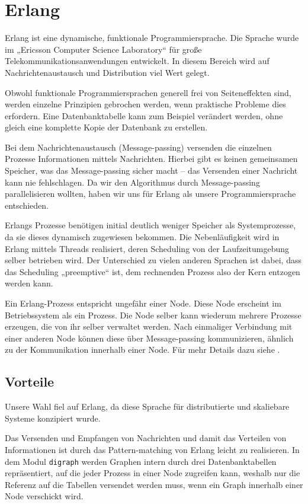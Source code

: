 \chapter{Erlang}
Erlang ist eine dynamische, funktionale Programmiersprache.  Die
Sprache wurde im „Ericsson Computer Science Laboratory“ für große
Telekommunikationsanwendungen entwickelt. In diesem Bereich wird auf
Nachrichtenaustausch und Distribution viel Wert gelegt.

Obwohl funktionale Programmiersprachen generell frei von
Seiteneffekten sind, werden einzelne Prinzipien gebrochen werden, wenn
praktische Probleme dies erfordern.  Eine Datenbanktabelle kann zum
Beispiel verändert werden, ohne gleich eine komplette Kopie der
Datenbank zu erstellen.

Bei dem Nachrichtenaustausch (Message-passing) versenden die einzelnen
Prozesse Informationen mittels Nachrichten.  Hierbei gibt es keinen
gemeinsamen Speicher, was das Message-passing sicher macht – das
Versenden einer Nachricht kann nie fehlschlagen.  Da wir den
Algorithmus durch Message-passing parallelisieren wollten, haben wir
uns für Erlang als unsere Programmiersprache entschieden.

Erlangs Prozesse benötigen initial deutlich weniger Speicher als
Systemprozesse, da sie dieses dynamisch zugewiesen bekommen.  Die
Nebenläufigkeit wird in Erlang mittels Threads realisiert, deren
Scheduling von der Laufzeitumgebung selber betrieben wird.  Der
Unterschied zu vielen anderen Sprachen ist dabei, dass das Scheduling
„preemptive“ ist, dem rechnenden Prozess also der Kern entzogen werden
kann.

Ein Erlang-Prozess entspricht ungefähr einer Node.  Diese Node
erscheint im Betriebssystem als ein Prozess.  Die Node selber kann
wiederum mehrere Prozesse erzeugen, die von ihr selber verwaltet
werden.  Nach einmaliger Verbindung mit einer anderen Node können
diese über Message-passing kommunizieren, ähnlich zu der Kommunikation
innerhalb einer Node.  Für mehr Details dazu siehe
\cite[Kapitel~„Distribunomicon“]{lyse}.

\section{Vorteile}
Unsere Wahl fiel auf Erlang, da diese Sprache für distributierte und
skaliebare Systeme konzipiert wurde.

Das Versenden und Empfangen von Nachrichten und damit das Verteilen
von Informationen ist durch das Pattern-matching von Erlang leicht zu
realisieren.  In dem Modul \lstinline!digraph!  werden Graphen intern
durch drei Datenbanktabellen repräsentiert, auf die jeder Prozess in
einer Node zugreifen kann, weshalb nur die Referenz auf die Tabellen
versendet werden muss, wenn ein Graph innerhalb einer Node verschickt
wird.

